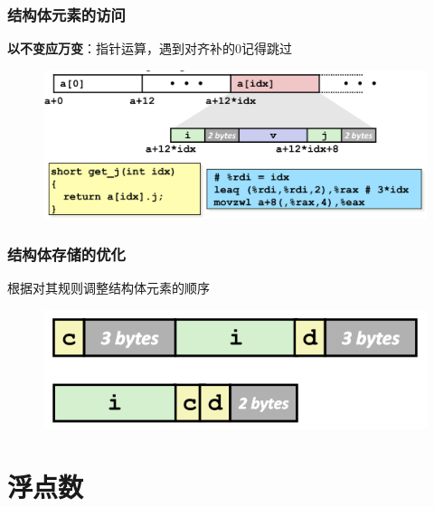 \documentclass[12pt,AutoFakeBold,aspectratio=169,mathserif]{beamer}
\begin{document}
    \begin{frame}
        \frametitle{结构体元素的访问}
    
        \textbf{以不变应万变}：指针运算，遇到对齐补的0记得跳过

        \begin{figure}
            \includegraphics[width=.8\textwidth]{figures/visit.png}
        \end{figure}
    
    \end{frame}

    \begin{frame}
        \frametitle{结构体存储的优化}
    
        根据对其规则调整结构体元素的顺序

        \begin{figure}
            \includegraphics[width=.618\textwidth]{figures/small.png}
        \end{figure}

    
    \end{frame}

    \section{浮点数}
\end{document}
